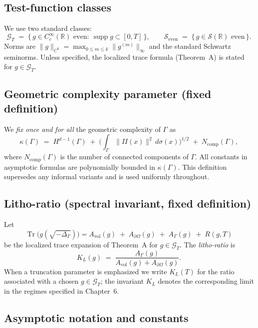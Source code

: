 \subsection{Test-function classes}

We use two standard classes:
\[
\mathcal{G}_T \;=\; \{\, g\in C_c^\infty(\mathbb{R}) \text{ even}:\ \operatorname{supp} g \subset [0,T] \,\},
\qquad
\mathcal{S}_{\mathrm{even}} \;=\; \{\, g\in \mathcal{S}(\mathbb{R}) \text{ even} \,\}.
\]
Norms are $\|g\|_{C^k}=\max_{0\le m\le k}\|g^{(m)}\|_\infty$ and the standard
Schwartz seminorms. Unless specified, the localized trace formula (Theorem~A)
is stated for $g\in\mathcal{G}_T$.

\subsection{Geometric complexity parameter (fixed definition)}

We \emph{fix once and for all} the geometric complexity of $\Gamma$ as
\begin{equation}\label{eq:kappa-fixed}
\kappa(\Gamma) \;=\;
H^{d-1}(\Gamma)
\;+\;
\Big( \int_\Gamma \|II(x)\|^2 \, d\sigma(x) \Big)^{1/2}
\;+\;
N_{\mathrm{comp}}(\Gamma),
\end{equation}
where $N_{\mathrm{comp}}(\Gamma)$ is the number of connected components of $\Gamma$.
All constants in asymptotic formulas are polynomially bounded in $\kappa(\Gamma)$.
This definition supersedes any informal variants and is used uniformly throughout.

\subsection{Litho-ratio (spectral invariant, fixed definition)}

Let
\[
\operatorname{Tr}\!\big(g(\sqrt{-\Delta_\Gamma})\big)
=
A_{\mathrm{vol}}(g) \;+\; A_{\partial\Omega}(g) \;+\; A_\Gamma(g) \;+\; R(g,T)
\]
be the localized trace expansion of Theorem~A for $g\in\mathcal{G}_T$.
The \emph{litho-ratio} is
\begin{equation}\label{eq:KL-fixed}
K_L(g) \;=\; \frac{A_\Gamma(g)}{A_{\mathrm{vol}}(g)+A_{\partial\Omega}(g)}.
\end{equation}
When a truncation parameter is emphasized we write $K_L(T)$ for the ratio
associated with a chosen $g\in\mathcal{G}_T$; the invariant $K_L$ denotes
the corresponding limit in the regimes specified in Chapter~6.

\subsection{Asymptotic notation and constants}

